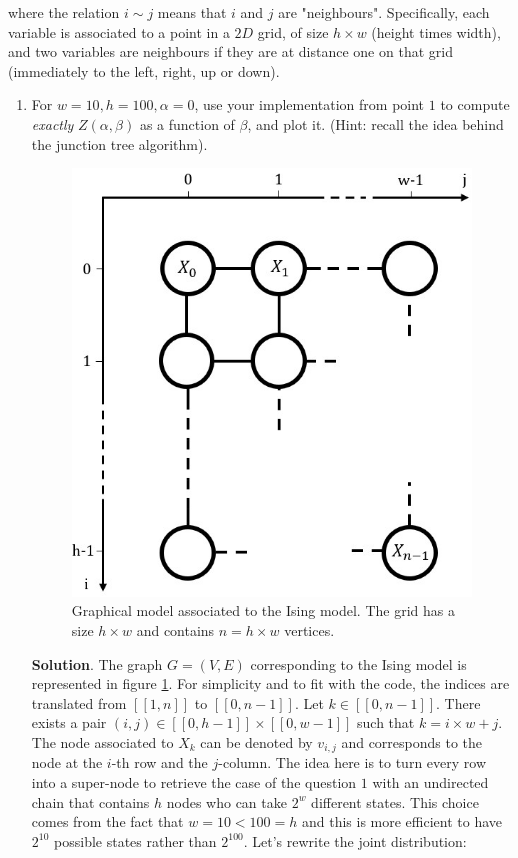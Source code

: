 \documentclass[a4paper, 11pt]{report}
\begin{document}
where the relation $i \sim j$ means that $i$ and $j$ are "neighbours". Specifically, each variable is associated to a point in a $2D$ grid, of size $h \times w$ (height times width), and two variables are neighbours if they are at distance one on that grid (\ie immediately to the left, right, up or down).

\begin{enumerate}[resume]
    \item For $w = 10, h = 100, \alpha = 0$, use your implementation from point $1$ to compute \emph{exactly} $Z \left( \alpha, \beta \right)$ as a function of $\beta$, and plot it. (Hint: recall the idea behind the junction tree algorithm).
    
    \begin{figure}
        \centering
        \includegraphics[scale=.7]{images/ising_model.jpg}
        \caption{Graphical model associated to the Ising model. The grid has a size $h \times w$ and contains $n = h \times w$ vertices.}
        \label{fig:ising}
    \end{figure}
    
    \textbf{Solution}. The graph $G = \left( V, E \right)$ corresponding to the Ising model is represented in figure \ref{fig:ising}. For simplicity and to fit with the code, the indices are translated from $[\![ 1, n ]\!]$ to $[\![ 0, n-1 ]\!]$. Let $k \in [\![ 0, n-1 ]\!]$. There exists a pair $(i, j) \in [\![ 0, h-1 ]\!] \times [\![ 0, w-1 ]\!]$ such that $k = i \times w + j$. The node associated to $X_k$ can be denoted by $v_{i, j}$ and corresponds to the node at the $i$-th row and the $j$-column. The idea here is to turn every row into a super-node to retrieve the case of the question $1$ with an undirected chain that contains $h$ nodes who can take $2^{w}$ different states. This choice comes from the fact that $w = 10 < 100 = h$ and this is more efficient to have $2^{10}$ possible states rather than $2^{100}$. Let's rewrite the joint distribution:
    

\end{enumerate}
\end{document}
